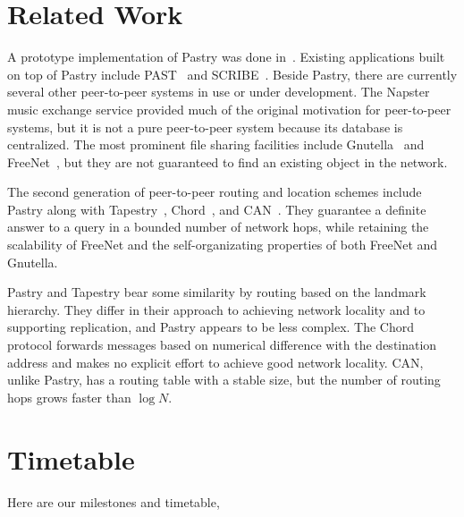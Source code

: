 \documentclass{article}
\begin{document}
\section{Related Work}
A prototype implementation of Pastry was done in~\cite{RoD01B}.
Existing applications built on top of Pastry include 
PAST~\cite{DrR01,RoD01A} and SCRIBE~\cite{RKC01}.
Beside Pastry, there are currently several other peer-to-peer 
systems in use or under development.
The Napster~\cite{Nap} music exchange service provided much 
of the original motivation for peer-to-peer systems, but it 
is not a pure peer-to-peer system because its database is 
centralized. 
The most prominent file sharing facilities include Gnutella~\cite{Gnu} 
and FreeNet~\cite{CSW00}, but they are not guaranteed to 
find an existing object in the network.

The second generation of peer-to-peer routing and 
location schemes include Pastry along with Tapestry~\cite{ZKJ01}, 
Chord~\cite{SMK01}, and CAN~\cite{RFH01}.
They guarantee a definite answer to a query in a bounded number 
of network hops, while retaining the scalability of FreeNet
and the self-organizating properties of both FreeNet and Gnutella.

Pastry and Tapestry bear some similarity by routing based on 
the landmark hierarchy.  They differ in their approach to 
achieving network locality and to supporting replication, 
and Pastry appears to be less complex.
The Chord protocol forwards messages based on numerical 
difference with the destination address and makes no 
explicit effort to achieve good network locality.
CAN, unlike Pastry, has a routing table with a stable size, 
but the number of routing hops grows faster than $\log N$.

\section{Timetable}

Here are our milestones and timetable,
\end{document}
